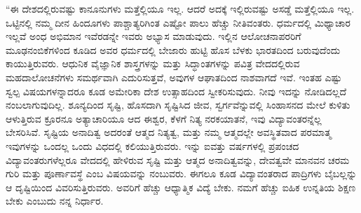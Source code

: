  “ಈ ದೇಶದಲ್ಲಿರುವಷ್ಟು ಕಾನೂನುಗಳು ಮತ್ತೆಲ್ಲಿಯೂ ಇಲ್ಲ. ಆದರೆ ಅದಕ್ಕೆ ಇಲ್ಲಿರುವಷ್ಟು ಅಸಡ್ಡೆ ಮತ್ತೆಲ್ಲಿಯೂ ಇಲ್ಲ. ಒಟ್ಟಿನಲ್ಲಿ ನಮ್ಮ ದೀನ ಹಿಂದೂಗಳು ಪಾಶ್ಚಾತ್ಯರಿಗಿಂತ ಎಷ್ಟೋ ಪಾಲು ಹೆಚ್ಚು ನೀತಿವಂತರು. ಧರ್ಮದಲ್ಲಿ ಮಿಥ್ಯಾಚಾರ ಇಲ್ಲವೆ ಅಂಧ ಅಭಿಮಾನ ಇವೆರಡನ್ನೇ ಇವರು ಅಭ್ಯಾಸ ಮಾಡುವುದು. ಇಲ್ಲಿನ ಆಲೋಚನಾಪರರಿಗೆ ಮೂಢನಂಬಿಕೆಗಳಿಂದ ಕೂಡಿದ ಅವರ ಧರ್ಮದಲ್ಲಿ ಬೇಜಾರು ಹುಟ್ಟಿ ಹೊಸ ಬೆಳಕು ಭಾರತದಿಂದ ಬರುವುದೆಂದು ಕಾಯುತ್ತಿರುವರು. ಆಧುನಿಕ ವೈಜ್ಞಾನಿಕ ಶಾಸ್ತ್ರಗಳನ್ನು ಮತ್ತು ಸಿದ್ಧಾಂತಗಳನ್ನು ಪವಿತ್ರ ವೇದದಲ್ಲಿರುವ ಮಹದಾಲೋಚನೆಗಳು ಸಮರ್ಥವಾಗಿ ಎದುರಿಸುತ್ತವೆ, ಅವುಗಳ ಆಘಾತದಿಂದ ನಾಶವಾಗದೆ ಇವೆ. ಇಂತಹ ಎಷ್ಟು ಸ್ವಲ್ಪ ವಿಷಯಗಳನ್ನಾದರೂ ಕೂಡ ಅಮೇರಿಕಾ ದೇಶ ಉತ್ಸಾಹದಿಂದ ಸ್ವೀಕರಿಸುವುದು. ನೀವು ಇದನ್ನು ನೋಡಿದಲ್ಲದೆ ನಂಬಲಾಗುವುದಿಲ್ಲ. ಶೂನ್ಯದಿಂದ ಸೃಷ್ಟಿ, ಹೊಸದಾಗಿ ಸೃಷ್ಟಿಸಿದ ಜೀವ, ಸ್ವರ್ಗವೆನ್ನುವಲ್ಲಿ ಸಿಂಹಾಸನದ ಮೇಲೆ ಕುಳಿತು ಆಳುತ್ತಿರುವ ಕ್ರೂರನೂ ಅತ್ಯಾಚಾರಿಯೂ ಆದ ಈಶ್ವರ, ಕೆಳಗೆ ನಿತ್ಯ ನರಕಯಾತನೆ, ಇವು ವಿದ್ಯಾವಂತರನ್ನೆಲ್ಲ ಬೇಸರಿಸಿವೆ. ಸೃಷ್ಟಿಯ ಅನಾದಿತ್ವ ಅದರಂತೆ ಆತ್ಮದ ನಿತ್ಯತ್ವ, ಮತ್ತು ನಮ್ಮ ಆತ್ಮದಲ್ಲೇ ಅವಸ್ಥಿತವಾದ ಪರಮಾತ್ಮ ಇವುಗಳನ್ನು ಒಂದಲ್ಲ ಒಂದು ವಿಧದಲ್ಲಿ ಕಲಿಯುತ್ತಿರುವರು. ಇನ್ನು ಐವತ್ತು ವರ್ಷಗಳಲ್ಲಿ ಪ್ರಪಂಚದ ವಿದ್ಯಾವಂತರುಗಳೆಲ್ಲರೂ ವೇದದಲ್ಲಿ ಹೇಳಿರುವ ಸೃಷ್ಟಿ ಮತ್ತು ಆತ್ಮದ ಅನಾದಿತ್ವವನ್ನು, ದೇವತ್ವವೇ ಮಾನವನ ಚರಮ ಗುರಿ ಮತ್ತು ಪೂರ್ಣಾವಸ್ಥೆ ಎಂಬ ವಿಷಯವನ್ನು ನಂಬುವರು. ಈಗಲೂ ಕೂಡ ವಿದ್ಯಾವಂತರಾದ ಪಾದ್ರಿಗಳು ಬೈಬಲ್ಲನ್ನು ಆ ದೃಷ್ಟಿಯಿಂದ ವಿವರಿಸುತ್ತಿರುವರು. ಅವರಿಗೆ ಹೆಚ್ಚು ಆಧ್ಯಾತ್ಮಿಕ ವಿದ್ಯೆ ಬೇಕು. ನಮಗೆ ಹೆಚ್ಚು ಐಹಿಕ ಉನ್ನತಿಯ ಶಿಕ್ಷಣ ಬೇಕು ಎಂಬುದು ನನ್ನ ನಿರ್ಧಾರ.

